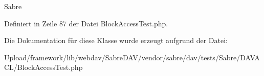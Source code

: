 Sabre 

Definiert in Zeile 87 der Datei Block\+Access\+Test.\+php.



Die Dokumentation für diese Klasse wurde erzeugt aufgrund der Datei\+:\begin{DoxyCompactItemize}
\item 
Upload/framework/lib/webdav/\+Sabre\+D\+A\+V/vendor/sabre/dav/tests/\+Sabre/\+D\+A\+V\+A\+C\+L/Block\+Access\+Test.\+php\end{DoxyCompactItemize}
